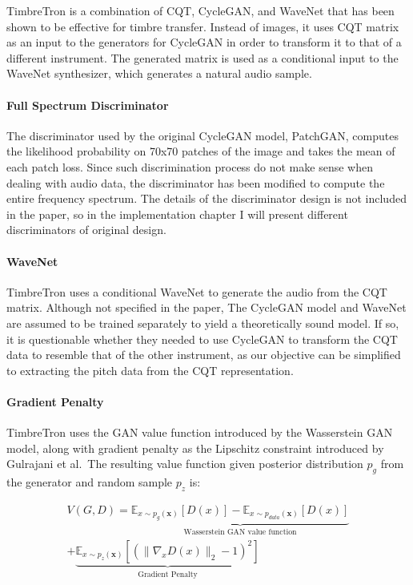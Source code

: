 \documentclass[12pt,a4paper,]{report}
\begin{document}
TimbreTron is a combination of CQT, CycleGAN, and WaveNet that has been
shown to be effective for timbre transfer. Instead of images, it uses
CQT matrix as an input to the generators for CycleGAN in order to
transform it to that of a different instrument. The generated matrix is
used as a conditional input to the WaveNet synthesizer, which generates
a natural audio sample.

\paragraph{Full Spectrum Discriminator}

The discriminator used by the original CycleGAN model, PatchGAN,
computes the likelihood probability on 70x70 patches of the image and
takes the mean of each patch loss. Since such discrimination process do
not make sense when dealing with audio data, the discriminator has been
modified to compute the entire frequency spectrum. The details of the
discriminator design is not included in the paper, so in the
implementation chapter I will present different discriminators of
original design.

\paragraph{WaveNet}

TimbreTron uses a conditional WaveNet to generate the audio from the CQT
matrix. Although not specified in the paper, The CycleGAN model and
WaveNet are assumed to be trained separately to yield a theoretically
sound model. If so, it is questionable whether they needed to use
CycleGAN to transform the CQT data to resemble that of the other
instrument, as our objective can be simplified to extracting the pitch
data from the CQT representation.

\paragraph{Gradient Penalty}

TimbreTron uses the GAN value function introduced by the Wasserstein GAN
model, along with gradient penalty as the Lipschitz constraint
introduced by Gulrajani et al.~The resulting value function given
posterior distribution \(p_g\) from the generator and random sample
\(p_z\) is:

\begin{multline}
    V(G, D) = \underbrace{
        \mathbb{E}_{x \sim p_{g}(\mathbf{x})} [D(x)] - \mathbb{E}_{x \sim p_{data}(\mathbf{x})} [D(x)]
        }_\textrm{Wasserstein GAN value function} \\ +
        \underbrace{
            \mathbb{E}_{x \sim p_z(\mathbf{x})} [(\| \nabla_x D(x) \|_2 - 1)^2]
        }_\textrm{Gradient Penalty} 
\end{multline}
\end{document}
